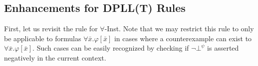 \documentclass{llncs}
\begin{document}
\begin{comment}
We define the following invariant for DPLL(T): \\

{\bf Invariant 1}:
For all DPLL(T) states $M \parallel F$, the only instance of literal $\bot^\psi$ in $F$ occur in clauses $C_1 \ldots C_n$ such that $C_1 \ldots C_n$ is logically equivalent to $( \neg \psi \vee \neg \bot^\psi \vee \neg \psi[\bar{e}/\bar{x}] )$ where $\bar{e} = \mathcal{I}( \psi )$.

It can be shown that counterexample $\forall$-Inst maintains Invariants 1.
Also note that since counterexample literals $\bot^\psi$ have no meaning apart from representing boolean values, no lemma added to $F$ by $T$-Learn will violate Invariant 1.
\end{comment}

\subsection{Enhancements for DPLL(T) Rules}
\label{sec:enhance-dpllt}

First, let us revisit the rule for $\forall$-Inst.
Note that we may restrict this rule to only be applicable to formulas $\forall \bar{x}. \varphi[ \bar{ x } ]$ in cases where a counterexample can exist to $\forall \bar{x}. \varphi[ \bar{ x } ]$.
Such cases can be easily recognized by checking if $\neg \bot^\psi$ is asserted negatively in the current context.
\end{document}
